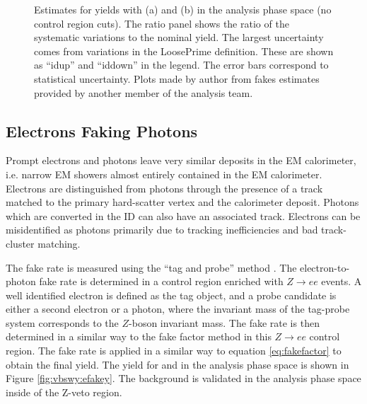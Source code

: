 \begin{figure}[t]
\caption{Estimates for \jfakey yields with \mjj (a) and \leppt (b) in the analysis phase space (no control region cuts). The ratio panel shows the ratio of the systematic variations to the nominal yield. The largest uncertainty comes from variations in the LoosePrime definition. These are shown as ``id\tu up'' and ``id\tu down'' in the legend. The error bars correspond to statistical uncertainty. Plots made by author from fakes estimates provided by another member of the analysis team.\label{fig:vbswy:jfakey}}
\end{figure}

\subsection{Electrons Faking Photons}

Prompt electrons and photons leave very similar deposits in the EM calorimeter, i.e. narrow EM showers almost entirely contained in the EM calorimeter. Electrons are distinguished from photons through the presence of a track matched to the primary hard-scatter vertex and the calorimeter deposit. Photons which are converted in the ID can also have an associated track. Electrons can be misidentified as photons primarily due to tracking inefficiencies and bad track-cluster matching.

The \efakey fake rate is measured using the ``tag and probe'' method \cite{VBSWy:tagprobe}. The electron-to-photon fake rate is determined in a control region enriched with $Z\rightarrow ee$ events. A well identified electron is defined as the tag object, and a probe candidate is either a second electron or a photon, where the invariant mass of the tag-probe system corresponds to the $Z$-boson invariant mass. The fake rate is then determined in a similar way to the fake factor method in this $Z\rightarrow ee$ control region. The fake rate is applied in a similar way to equation \ref{eq:fakefactor} to obtain the final \efakey yield. The \efakey yield for \mjj and \leppt in the analysis phase space is shown in Figure \ref{fig:vbswy:efakey}. The \efakey background is validated in the analysis phase space inside of the Z-veto region. 

